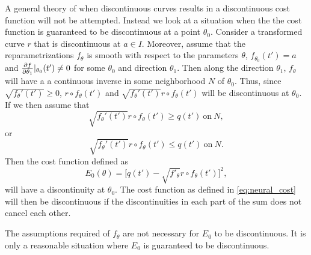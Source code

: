 A general theory of when discontinuous curves results in a discontinuous cost function will not be attempted. Instead we look at a situation when the the cost function is guaranteed to be discontinuous at a point \(\theta_0\). Consider a transformed curve  \(r\) that is discontinuous at  \(a \in I\). Moreover, assume that the reparametrizations  \(f_{\theta}\) is smooth with respect to the parameters  \(\theta\), \(f_{\theta_0}(t')=a\) and  \(\pdv{f}{\theta_1}|_{\theta_0}(t')\neq 0\) for some  \(\theta_0\) and direction \(\theta_1\). Then along the direction  \(\theta_1\),  \(f_{\theta}\) will have a a continuous inverse in some neighborhood  \(N\) of  \(\theta_0\). Thus, since \(\sqrt{f_{\theta}'(t')} \geq 0\), \(r \circ f_\theta(t')\) and  \(\sqrt{f_{\theta}'(t')} r \circ f_\theta(t')\) will be discontinuous at \(\theta_0\). If we then assume that
\begin{equation}
  \sqrt{f_{\theta}'(t')} r \circ f_\theta(t') \geq  q(t')\ \text{on} \ N,
\end{equation}
or
\begin{equation}
  \sqrt{f_{\theta}'(t')} r \circ f_\theta(t') \leq q(t') \ \text{on} \ N.
\end{equation}
Then the cost function defined as
\begin{equation}
  E_0(\theta) = \big[q(t') - \sqrt{f'_{\theta}} r \circ f_{\theta}(t')\big]^2,
\end{equation}
will have a discontinuity at  \(\theta_0\). The cost function as defined in \eqref{eq:neural_cost} will then be discontinuous if the discontinuities in each part of the sum does not cancel each other.

The assumptions required of  \(f_{\theta}\) are not necessary for \(E_0\) to be discontinuous. It is only a reasonable situation where \(E_0\) is guaranteed to be discontinuous. 

